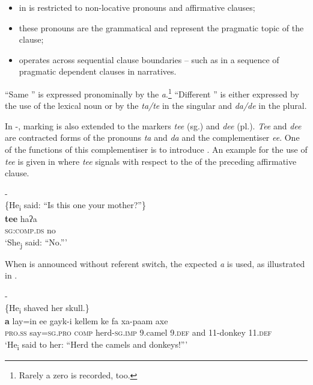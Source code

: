 \documentclass[output=paper
,newtxmath
,modfonts
,nonflat]{langsci/langscibook}
\begin{document}
\begin{itemize}
\item {} in  is restricted to non-locative   pronouns and affirmative clauses;

\item these pronouns are the grammatical  and represent the pragmatic topic of the clause;

\item {} operates across sequential clause boundaries -- such as in a sequence of pragmatic dependent clauses in narratives.
\end{itemize}

“Same ” is expressed pronominally by the  \textit{a}.\footnote{Rarely a zero  is recorded, too.}  “Different ” is either expressed by the use of the lexical noun or by the  \textit{ta/te} in the singular and \textit{da/de} in the plural.

In -,  marking is also extended to the  markers \textit{tee} (sg.) and \textit{dee} (pl.). \textit{Tee} and \textit{dee} are contracted forms of the pronouns \textit{ta} and \textit{da} and the complementiser \textit{ee}. One of the functions of this complementiser is to introduce . An example for the use of \textit{tee} is given in  where \textit{tee} signals  with respect to the  of the preceding affirmative clause. 

\ea\label{ex:apel:21}
{- \citep[285]{Faye1979}}\\
{\-\hspace{0cm}\{He\textsubscript{i} said: “Is this one your mother?”\}}\\
\gll \textbf{tee} haʔa\\
     \textsc{sg:comp.ds} no \\
\glt ‘She\textsubscript{j} said: “No.”’
\z

When  is announced without referent switch, the expected  \textit{a} is used, as illustrated in . 

\ea\label{ex:apel:22}
{- \citep[284]{Faye1979}}\\
{\-\hspace{0cm}\{He\textsubscript{i} shaved her skull.\}}\\
\gll \textbf{a} lay=in ee gayk-i kellem ke fa xa-paam axe\\
     \textsc{pro.ss} say\textsc{=sg.pro} \textsc{comp} herd\textsc{-sg.imp} \textsc{9.}camel \textsc{9.def} and \textsc{11-}donkey \textsc{11.def} \\
\glt ‘He\textsubscript{i} said to her: “Herd the camels and donkeys!”’
\z
\end{document}
